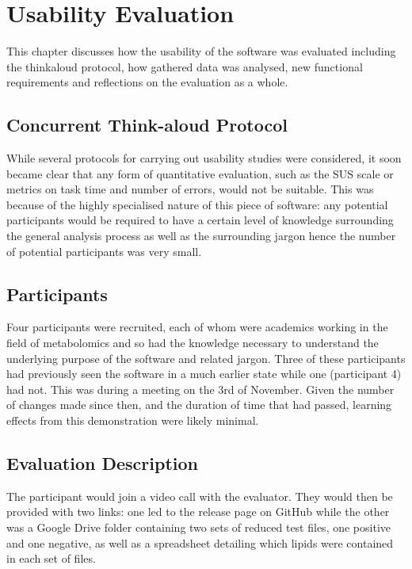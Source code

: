 \documentclass{l4proj}
\begin{document}
\chapter{Usability Evaluation} \label{usability-evaluation}
This chapter discusses how the usability of the software was evaluated including the thinkaloud protocol, how gathered data was analysed, new functional requirements and reflections on the evaluation as a whole.


\section{Concurrent Think-aloud Protocol} \label{think-aloud-protocol}
While several protocols for carrying out usability studies were considered, it soon became clear that any form of quantitative evaluation, such as the SUS scale or metrics on task time and number of errors, would not be suitable. This was because of the highly specialised nature of this piece of software: any potential participants would be required to have a certain level of knowledge surrounding the general analysis process as well as the surrounding jargon hence the number of potential participants was very small.

\section{Participants}
Four participants were recruited, each of whom were academics working in the field of metabolomics and so had the knowledge necessary to understand the underlying purpose of the software and related jargon. Three of these participants had previously seen the software in a much earlier state while one (participant 4) had not. This was during a meeting on the 3rd of November. Given the number of changes made since then, and the duration of time that had passed, learning effects from this demonstration were likely minimal.

\section{Evaluation Description}
The participant would join a video call with the evaluator. They would then be provided with two links: one led to the release page on GitHub while the other was a Google Drive folder containing two sets of reduced test files, one positive and one negative, as well as a spreadsheet detailing which lipids were contained in each set of files.
\end{document}
